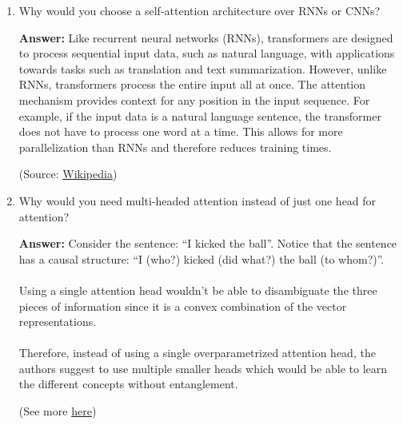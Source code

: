 \documentclass{article}
\newenvironment{QandA}{\begin{enumerate}[label=\arabic*.]}{\end{enumerate}}
\newenvironment{InnerQandA}{\begin{enumerate}[label=\roman*.]}{\end{enumerate}}
\newenvironment{answer}{\par\normalfont \textbf{Answer:}}{}
\begin{document}
\begin{QandA}
\begin{InnerQandA}
\begin{answer}
            (Source: \href{https://jalammar.github.io/illustrated-transformer/}{Jay Alammar's blog})
        \end{answer}

        \item Why would you choose a self-attention architecture over RNNs or CNNs?
        \begin{answer}
            Like recurrent neural networks (RNNs), transformers are designed to process sequential input data, such as natural language, with applications towards tasks such as translation and text summarization. However, unlike RNNs, transformers process the entire input all at once. The attention mechanism provides context for any position in the input sequence. For example, if the input data is a natural language sentence, the transformer does not have to process one word at a time. This allows for more parallelization than RNNs and therefore reduces training times.

            (Source: \href{https://en.wikipedia.org/wiki/Transformer\_(machine\_learning\_model)}{Wikipedia})
        \end{answer}

        \item Why would you need multi-headed attention instead of just one head for attention?
        \begin{answer}
            Consider the sentence: ``I kicked the ball''. Notice that the sentence has a causal structure: ``I (who?) kicked (did what?) the ball (to whom?)''. \\\\
            Using a single attention head wouldn't be able to disambiguate the three pieces of information since it is a convex combination of the vector representations. \\\\
            Therefore, instead of using a single overparametrized attention head, the authors suggest to use multiple smaller heads which would be able to learn the different concepts without entanglement. 

            (See more \href{https://www.youtube.com/watch?v=5vcj8kSwBCY}{here})
        \end{answer}


\end{InnerQandA}
\end{QandA}
\end{document}
